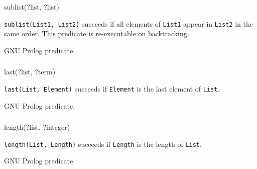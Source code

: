 \begin{TemplatesOneCol}
sublist(?list, ?list)

\end{TemplatesOneCol}

\Description

\texttt{sublist(List1, List2)} succeeds if all elements of \texttt{List1} appear in \texttt{List2} in the same order. This predicate is re-executable on backtracking.

\PlErrorsNone

\Portability

GNU Prolog predicate.

\subsubsection{}

\begin{TemplatesOneCol}
last(?list, ?term)

\end{TemplatesOneCol}

\Description

\texttt{last(List, Element)} succeeds if \texttt{Element} is the last element
of \texttt{List}.

\PlErrorsNone

\Portability

GNU Prolog predicate.

\subsubsection{}

\begin{TemplatesOneCol}
length(?list, ?integer)

\end{TemplatesOneCol}

\Description

\texttt{length(List, Length)} succeeds if \texttt{Length} is the length of
\texttt{List}.

\begin{PlErrors}


\end{PlErrors}

GNU Prolog predicate.

\subsubsection{}

